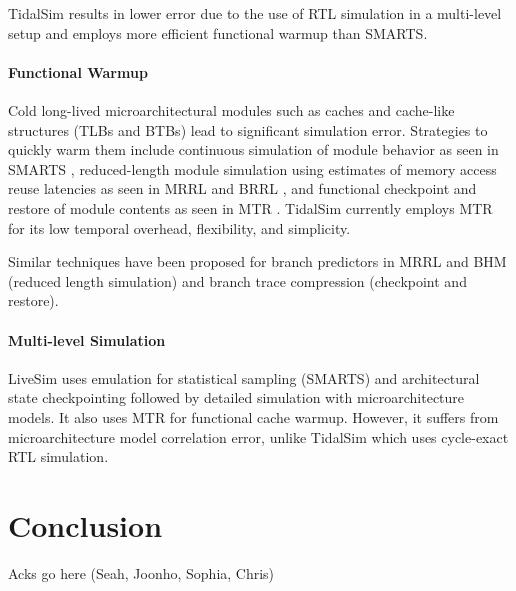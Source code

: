 \documentclass[sigplan,nonacm,10pt]{acmart}
\begin{document}
TidalSim results in lower error due to the use of RTL simulation in a multi-level setup and employs more efficient functional warmup than SMARTS.

\paragraph{Functional Warmup} Cold long-lived microarchitectural modules such as caches and cache-like structures (TLBs and BTBs) lead to significant simulation error. Strategies to quickly warm them include continuous simulation of module behavior as seen in SMARTS \cite{smarts}, reduced-length module simulation using estimates of memory access reuse latencies as seen in MRRL \cite{haskins2003memory} and BRRL \cite{eeckhout2005blrl}, and functional checkpoint and restore of module contents as seen in MTR \cite{barr2005accelerating}. TidalSim currently employs MTR for its low temporal overhead, flexibility, and simplicity.

Similar techniques have been proposed for branch predictors in MRRL and BHM \cite{kluyskens2007branch} (reduced length simulation) and branch trace compression \cite{barr2006branch} (checkpoint and restore).

\paragraph{Multi-level Simulation} LiveSim \cite{hassani2016livesim} uses emulation for statistical sampling (SMARTS) and architectural state checkpointing followed by detailed simulation with microarchitecture models. It also uses MTR for functional cache warmup. However, it suffers from microarchitecture model correlation error, unlike TidalSim which uses cycle-exact RTL simulation.

\section{Conclusion}


\begin{acks}
Acks go here (Seah, Joonho, Sophia, Chris)
\end{acks}




\end{document}
